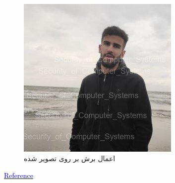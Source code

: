 \begin{figure}[H]
  \centering
  \includegraphics[width=0.7\textwidth]{Images/cropped.png}
  \caption{اعمال برش بر روی تصویر  شده}   
\end{figure}
\begin{latin}
\href{https://holypython.com/how-to-watermark-images-w-python-pil/}{\textcolor{blue}{Reference}}
\end{latin}

